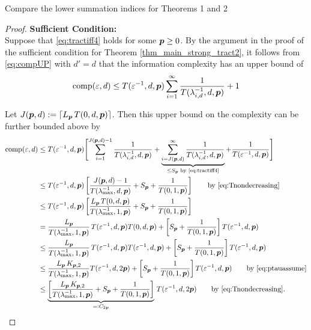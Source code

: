 \documentclass[11pt,a4paper]{article}
\newcommand{\fred}[1]{\begingroup\color{blue}#1\endgroup}
\begin{document}
\fred{Compare the lower summation indices for Theorems 1 and 2}
\begin{proof}
    \textbf{Sufficient Condition:}\\
Suppose that \eqref{eq:tractiff4} holds for some $\boldsymbol{p} \ge 0$. By the argument in the proof of the sufficient condition for Theorem \ref{thm_main_strong_tract2}, it follows from \eqref{eq:compUP} with $d'=d$ that the information complexity has an upper bound of
\begin{equation*}
	 \operatorname{comp}(\varepsilon,d) \le  T(\varepsilon^{-1},d,\boldsymbol{p}) \sum_{i=1}^\infty \frac{1}{T(\lambda_{i, d}^{-1},d,\boldsymbol{p})} + 1
\end{equation*}

Let $J(\boldsymbol{p},d): = \lceil L_{\boldsymbol{p}}\, T(0,d,\boldsymbol{p})\rceil$.  Then this upper bound on the complexity can be further bounded above by
\begin{align*}
       \operatorname{comp}(\varepsilon,d)
       & \le T(\varepsilon^{-1},d,\boldsymbol{p}) \Biggl [ \sum_{i=1}^{J(\boldsymbol{p},d) -1} \frac{1}{T(\lambda_{i, d}^{-1},d,\boldsymbol{p})}
       + \underbrace{\sum_{i=J(\boldsymbol{p},d)}^\infty \frac{1}{T(\lambda_{i, d}^{-1},d,\boldsymbol{p})}}_{\le S_{\boldsymbol{p}} \text{ by \eqref{eq:tractiff4}}}
       + \frac{1}{T(\varepsilon^{-1},d, \boldsymbol{p})} \Biggr ] \\
       & \le T(\varepsilon^{-1},d,\boldsymbol{p})\left[ \frac{J(\boldsymbol{p},d)-1}{T(\lambda_{\max}^{-1},d,\boldsymbol{p})} + S_{\boldsymbol{p}} + \frac{1}{T(0,1, \boldsymbol{p})}\right]
       \qquad \text{by \eqref{eq:Tnondecreasing}}  \\
       & \le T(\varepsilon^{-1},d,\boldsymbol{p})\left[\frac{L_{\boldsymbol{p}}\, T(0,d,\boldsymbol{p})}{T(\lambda_{\max}^{-1},1,\boldsymbol{p})} + S_{\boldsymbol{p}} + \frac{1}{T(0,1, \boldsymbol{p})}\right] \\
       & =\frac{L_{\boldsymbol{p}}}{T(\lambda_{\max}^{-1},1,\boldsymbol{p})} \,T(\varepsilon^{-1},d,\boldsymbol{p}) T(0,d,\boldsymbol{p}) + \left [  S_{\boldsymbol{p}} + \frac{1}{T(0,1, \boldsymbol{p})}\right] T(\varepsilon^{-1},d,\boldsymbol{p})\\
       & \le\frac{L_{\boldsymbol{p}}}{T(\lambda_{\max}^{-1},1,\boldsymbol{p})} \,T(\varepsilon^{-1},d,\boldsymbol{p}) T(\varepsilon^{-1},d,\boldsymbol{p}) +\left [  S_{\boldsymbol{p}} + \frac{1}{T(0,1, \boldsymbol{p})}\right] T(\varepsilon^{-1},d,\boldsymbol{p})\\
       & \le \frac{L_{\boldsymbol{p}}\,K_{\boldsymbol{p},2}}{T(\lambda_{\max}^{-1},1,\boldsymbol{p})}  T(\varepsilon^{-1},d,2\boldsymbol{p})  +\left [  S_{\boldsymbol{p}} + \frac{1}{T(0,1, \boldsymbol{p})}\right] T(\varepsilon^{-1},d,\boldsymbol{p})  \qquad \text{by \eqref{eq:ptauassume}}\\
       & \le \underbrace{\left[\frac{L_{\boldsymbol{p}}\,K_{\boldsymbol{p},2}}{T(\lambda_{\max}^{-1},1,\boldsymbol{p})} + S_{\boldsymbol{p}} + \frac{1}{T(0,1, \boldsymbol{p})}\right]}_{=:C_{2\boldsymbol{p}}} \,T(\varepsilon^{-1},d,2\boldsymbol{p}) \qquad \text{by \eqref{eq:Tnondecreasing}}.
\end{align*}


\end{proof}
\end{document}
